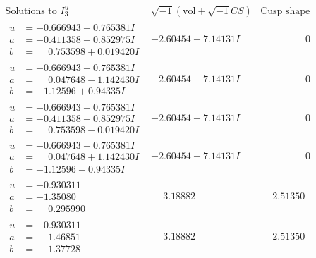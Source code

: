 \documentclass[1p]{elsarticle_modified}
\theoremstyle{definition}
\newcommand{\I}{\sqrt{-1}}
\begin{document}
$$\begin{array}{c|c|c}  
\text{Solutions to }I^u_{3}& \I (\text{vol} + \sqrt{-1}CS) & \text{Cusp shape}\\
 \hline 
\begin{aligned}
u &= -0.666943 + 0.765381 I \\
a &= -0.411358 + 0.852975 I \\
b &= \phantom{-}0.753598 + 0.019420 I\end{aligned}
 & -2.60454 + 7.14131 I & \phantom{-0.000000 } 0 \\ \hline\begin{aligned}
u &= -0.666943 + 0.765381 I \\
a &= \phantom{-}0.047648 - 1.142430 I \\
b &= -1.12596 + 0.94335 I\end{aligned}
 & -2.60454 + 7.14131 I & \phantom{-0.000000 } 0 \\ \hline\begin{aligned}
u &= -0.666943 - 0.765381 I \\
a &= -0.411358 - 0.852975 I \\
b &= \phantom{-}0.753598 - 0.019420 I\end{aligned}
 & -2.60454 - 7.14131 I & \phantom{-0.000000 } 0 \\ \hline\begin{aligned}
u &= -0.666943 - 0.765381 I \\
a &= \phantom{-}0.047648 + 1.142430 I \\
b &= -1.12596 - 0.94335 I\end{aligned}
 & -2.60454 - 7.14131 I & \phantom{-0.000000 } 0 \\ \hline\begin{aligned}
u &= -0.930311\phantom{ +0.000000I} \\
a &= -1.35080\phantom{ +0.000000I} \\
b &= \phantom{-}0.295990\phantom{ +0.000000I}\end{aligned}
 & \phantom{-}3.18882\phantom{ +0.000000I} & \phantom{-}2.51350\phantom{ +0.000000I} \\ \hline\begin{aligned}
u &= -0.930311\phantom{ +0.000000I} \\
a &= \phantom{-}1.46851\phantom{ +0.000000I} \\
b &= \phantom{-}1.37728\phantom{ +0.000000I}\end{aligned}
 & \phantom{-}3.18882\phantom{ +0.000000I} & \phantom{-}2.51350\phantom{ +0.000000I} \\ \hline\begin{aligned}

\end{aligned}
\end{array}$$
\end{document}
